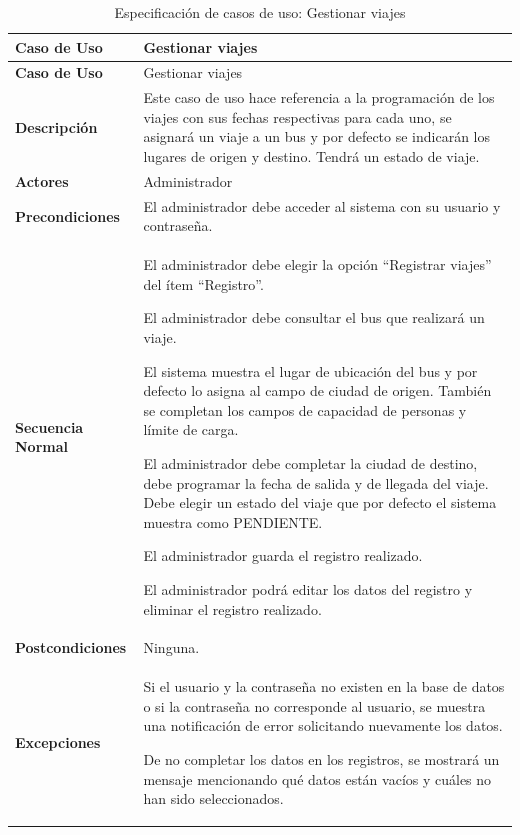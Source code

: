 	\endgroup 
	\vspace{-6pt}  %
	
	\begingroup
	\onehalfspacing
	
	\begin{longtable}{m{4cm} m{10.5cm}}
		\caption[Especificación de casos de uso: Gestionar viajes]{\newline Especificación de casos de uso: Gestionar viajes} \label{tab:tabla3_5}\\
		\toprule
		\textbf{Caso de Uso} & Gestionar viajes \\
		\midrule
		\endfirsthead
		
		\toprule
		\textbf{Caso de Uso} & Gestionar viajes \\
		\endhead
		
		
		\bottomrule
		\endlastfoot
		
		\textbf{Descripción} & Este caso de uso hace referencia a la programación de los viajes con sus fechas respectivas para cada uno, se asignará un viaje a un bus y por defecto se indicarán los lugares de origen y destino. Tendrá un estado de viaje. \\ \hline
		\textbf{Actores} & Administrador \\ \hline
		\textbf{Precondiciones} & El administrador debe acceder al sistema con su usuario y contraseña. \\ \hline
		\textbf{Secuencia Normal} & El administrador debe elegir la opción “Registrar viajes” del ítem “Registro”.
		
		El administrador debe consultar el bus que realizará un viaje.
		
		El sistema muestra el lugar de ubicación del bus y por defecto lo asigna al campo de ciudad de origen. También se completan los campos de capacidad de personas y límite de carga.
		
		El administrador debe completar la ciudad de destino, debe programar la fecha de salida y de llegada del viaje. Debe elegir un estado del viaje que por defecto el sistema muestra como PENDIENTE.
		
		El administrador guarda el registro realizado.
		
		El administrador podrá editar los datos del registro y eliminar el registro realizado. \\ \hline
		\textbf{Postcondiciones} & Ninguna.\\ \hline
		\textbf{Excepciones} & Si el usuario y la contraseña no existen en la base de datos o si la contraseña no corresponde al usuario, se muestra una notificación de error solicitando nuevamente los datos.
		
		De no completar los datos en los registros, se mostrará un mensaje mencionando qué datos están vacíos y cuáles no han sido seleccionados.
		
	\end{longtable}
	
